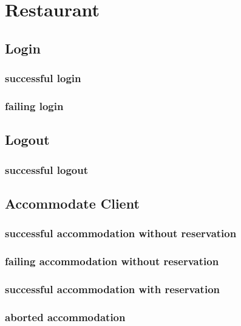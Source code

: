\documentclass[a4paper,11pt,oneside]{book}
\begin{document}
\pagestyle{plain}

\chapter*{Restaurant}

\section{Login}

\subsection{successful login}
\subsection{failing login}

\section{Logout}
\subsection{successful logout}

\section{Accommodate Client}

\subsection{successful accommodation without reservation}
\subsection{failing accommodation without reservation}
\subsection{successful accommodation with reservation}
\subsection{aborted accommodation}
\end{document}
